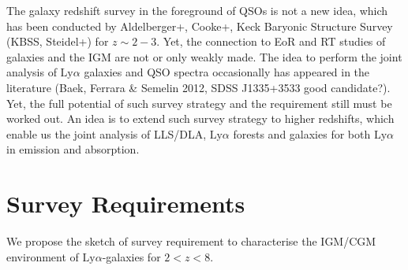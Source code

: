 \documentclass[useAMS,usenatbib,twocolumn]{mn2e}
\newcommand{\LyA}{\mbox{Ly}\alpha}
\begin{document}
The galaxy redshift survey in the foreground of QSOs is not a new
idea, which has been conducted by Aldelberger+, Cooke+, Keck Baryonic
Structure Survey (KBSS, Steidel+) for $z\sim2-3$. Yet, the connection
to EoR and RT studies of galaxies and the IGM are not or only weakly made.
The idea to perform the joint analysis of $\LyA$ galaxies and QSO spectra
occasionally has appeared in the literature (Baek, Ferrara \& Semelin 2012,
SDSS J1335+3533 good candidate?). Yet, the full potential of such survey
strategy and the requirement still must be worked out.
An idea is to extend such survey strategy to higher redshifts, which
enable us the joint analysis of LLS/DLA, $\LyA$ forests and galaxies for
both $\LyA$ in emission and absorption.


\section{Survey Requirements}
We propose the sketch of survey requirement to characterise the IGM/CGM 
environment of $\LyA$-galaxies for $2<z<8$.
\end{document}
